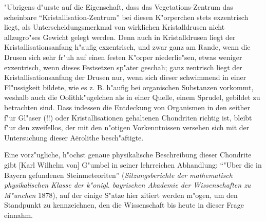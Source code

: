 \documentclass[a4paper, 11pt, oneside]{article}
\begin{document}
"Ubrigens d"urste auf die Eigenschaft, dass das Vegetations-Zentrum das scheinbare "`Kristallisation-Zentrum"' bei diesen K"orperchen stets exzentrisch liegt, als Unterscheidungsmerkmal von wirklichen Kristalldrusen nicht allzugro"ses Gewicht gelegt werden. Denn auch in Kristalldrusen liegt der Kristallisationsanfang h"aufig exzentrisch, und zwar ganz am Rande, wenn die Drusen sich sehr fr"uh auf einen festen K"orper niederlie"sen, etwas weniger exzentrisch, wenn dieses Festsetzen sp"ater geschah; ganz zentrisch liegt der Kristallisationsanfang der Drusen nur, wenn sich dieser schwimmend in einer Fl"ussigkeit bildete, wie es z. B. h"aufig bei organischen Substanzen vorkommt, weshalb auch die Oolithk"ugelchen als in einer Quelle, einem Sprudel, gebildet zu betrachten sind. Dass indessen die Entdeckung von Organismen in den seither f"ur Gl"aser (!!) oder Kristallisationen gehaltenen Chondriten richtig ist, bleibt f"ur den zweifellos, der mit den n"otigen Vorkenntnissen versehen sich mit der Untersuchung dieser Aërolithe besch"aftigte.

Eine vorz"ugliche, h"ochst genaue physikalische Beschreibung dieser Chondrite gibt [Karl Wilhelm von] G"umbel in seiner lehrreichen Abhandlung: "`"Uber die in Bayern gefundenen Steinmeteoriten"' (\emph{Sitzungsberichte der mathematisch physikalischen Klasse der k"onigl. bayrischen Akademie der Wissenschaften zu M"unchen} 1878), auf der einige S"atze hier zitiert werden m"ogen, um den Standpunkt zu kennzeichnen, den die Wissenschaft bis heute in dieser Frage einnahm.
\end{document}
